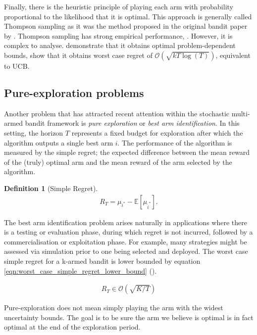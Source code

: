 \documentclass[11pt,a4paper,twoside]{report}
\newcommand{\E}[1]{\mathbb E\left[{#1}\right]}
\newcommand{\eqn}[1]{\begin{align}#1\end{align}}
\newcommand{\bigo}[1]{\mathcal{O}\left( #1 \right)}
\newcommand{\simpleregret}{R_T}
\theoremstyle{plain}
\theoremstyle{definition}
\newtheorem{definition}[theorem]{Definition}
\begin{document}
Finally, there is the heuristic principle of playing each arm with probability proportional to the likelihood that it is optimal. This approach is generally called Thompson sampling as it was the method proposed in the original bandit paper by \citet{Thompson1993}. Thompson sampling has strong empirical performance, \citep{chapelle2011empirical}. However, it is complex to analyse. \citet{kaufmann2012thompson} demonstrate that it obtains optimal problem-dependent bounds, \citet{agrawal2013further} show that it obtains worst case regret of $\bigo{\sqrt{kT\log(T)}}$, equivalent to UCB. 

\subsection{Pure-exploration problems}
\label{sec:pure-exploitation-problems}
Another problem that has attracted recent attention \citep{Bubeck2009,Audibert2010,Gabillon2012,Karnin2013} within the stochastic multi-armed bandit framework is \textit{pure exploration} or \textit{best arm identification}. In this setting, the horizon $T$ represents a fixed budget for exploration after which the algorithm outputs a single best arm $i$. The performance of the algorithm is measured by the simple regret; the expected difference between the mean reward of the (truly) optimal arm and the mean reward of the arm selected by the algorithm.

\vspace{0.5cm}
\begin{definition}[Simple Regret]
\eqn{
\label{eqn:simple_regret}
\simpleregret=\mu_{i^*} - \E{\mu_{\hat i^*}}.
}
\end{definition}

The best arm identification problem arises naturally in applications where there is a testing or evaluation phase, during which regret is not incurred, followed by a commercialisation or exploitation phase. For example, many strategies might be assessed via simulation prior to one being selected and deployed. The worst case simple regret for a k-armed bandit is lower bounded by equation \ref{eqn:worst_case_simple_regret_lower_bound} (\citep{Bubeck2009}).

\eqn{
\label{eqn:worst_case_simple_regret_lower_bound}
\simpleregret \in \bigo{\sqrt{K/T}}
}



Pure-exploration does not mean simply playing the arm with the widest uncertainty bounds. The goal is to be sure the arm we believe is optimal is in fact optimal at the end of the exploration period. 
\end{document}
